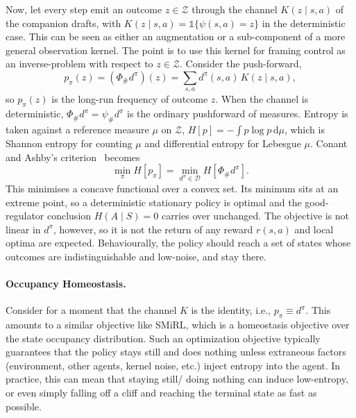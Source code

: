 \documentclass[11pt]{article}
\theoremstyle{remark}
\newcommand{\Zcal}{\mathcal Z}
\newcommand{\Dcal}{\mathcal D}
\newcommand{\1}{\mathds{1}}
\newcommand{\dd}{\mathrm d}
\newcommand{\occ}{d^{\pi}}
\newcommand{\push}{\Phi_{\#}}
\newcommand{\pz}{p_{\pi}}
\newcommand{\Hf}[1]{H\!\left[#1\right]}
\begin{document}
Now, let every step emit an outcome $z\in\Zcal$ through the channel $K(z\mid s,a)$ of the companion drafts, with $K(z\mid s,a)=\1\{\psi(s,a)=z\}$ in the deterministic case.
This can be seen as either an augmentation or a sub-component of a more general observation kernel.
The point is to use this kernel for framing control as an inverse-problem with respect to $z\in\Zcal$.
Consider the push-forward,
\begin{equation}
  \pz(z)=(\push\occ)(z)=\sum_{s,a}\occ(s,a)\,K(z\mid s,a),
  \label{eq:push}
\end{equation}
so $\pz(z)$ is the long-run frequency of outcome $z$.
When the channel is deterministic, $\push\occ=\psi_{\#}\occ$ is the ordinary pushforward of measures.
Entropy is taken against a reference measure $\mu$ on $\Zcal$, $\Hf{p}=-\int p\log p\,\dd\mu$, which is Shannon entropy for counting $\mu$ and differential entropy for Lebesgue $\mu$.
Conant and Ashby's criterion~\citep{Conant-good70} becomes
\begin{equation}
  \min_{\pi}\Hf{\pz}=\min_{\occ\in\Dcal}\Hf{\push\occ}.
  \label{eq:obj}
\end{equation}
This minimises a concave functional over a convex set.
Its minimum sits at an extreme point, so a deterministic stationary policy is optimal and the good-regulator conclusion $H(A\mid S)=0$ carries over unchanged.
The objective is not linear in $\occ$, however, so it is not the return of any reward $r(s,a)$ and local optima are expected.
Behaviourally, the policy should reach a set of states whose outcomes are indistinguishable and low-noise, and stay there.


\paragraph{Occupancy Homeostasis.}
Consider for a moment that the channel $K$ is the identity, i.e., $p_\pi \equiv d^\pi$.
This amounts to a similar objective like SMiRL, which is a homeostasis objective over the state occupancy distribution.
Such an optimization objective typically guarantees that the policy stays still and does nothing unless extraneous factors (environment, other agents, kernel noise, etc.) inject entropy into the agent.
In practice, this can mean that staying still/ doing nothing can induce low-entropy, or even simply falling off a cliff and reaching the terminal state as fast as possible.
\end{document}

